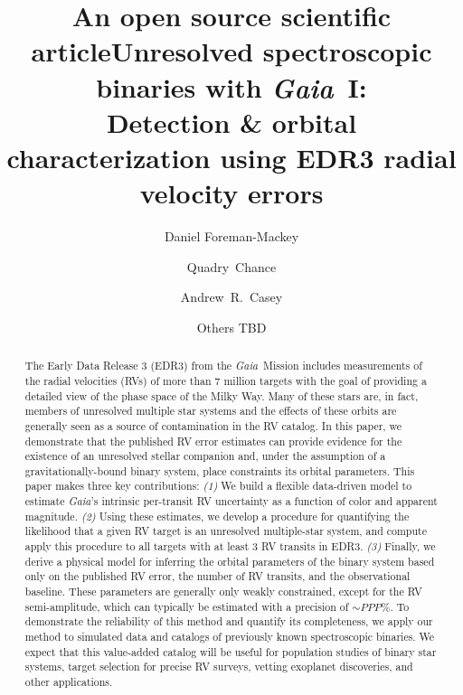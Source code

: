 \documentclass[modern, letterpaper]{aastex631}
\newcommand{\project}[1]{\textsl{#1}}
\newcommand{\Gaia}{\project{Gaia}}
\begin{document}
\title{An open source scientific article}

\title{Unresolved spectroscopic binaries with \Gaia\ I: \\
	Detection \& orbital characterization using EDR3 radial velocity errors}


\author[0000-0002-9328-5652]{Daniel Foreman-Mackey}

\author{Quadry~Chance}

\author{Andrew~R.~Casey}

\author{Others TBD}
\noaffiliation{}

\begin{abstract}
	The Early Data Release 3 (EDR3) from the \Gaia\ Mission includes measurements of the radial velocities (RVs) of more than 7 million targets with the goal of providing a detailed view of the phase space of the Milky Way.
	Many of these stars are, in fact, members of unresolved multiple star systems and the effects of these orbits are generally seen as a source of contamination in the RV catalog.
	In this paper, we demonstrate that the published RV error estimates can provide evidence for the existence of an unresolved stellar companion and, under the assumption of a gravitationally-bound binary system, place constraints its orbital parameters.
	This paper makes three key contributions:
	\emph{(1)} We build a flexible data-driven model to estimate \Gaia's intrinsic per-transit RV uncertainty as a function of color and apparent magnitude.
	\emph{(2)} Using these estimates, we develop a procedure for quantifying the likelihood that a given RV target is an unresolved multiple-star system, and compute apply this procedure to all targets with at least 3 RV transits in EDR3.
	\emph{(3)} Finally, we derive a physical model for inferring the orbital parameters of the binary system based only on the published RV error, the number of RV transits, and the observational baseline.
	These parameters are generally only weakly constrained, except for the RV semi-amplitude, which can typically be estimated with a precision of $\sim PPP\%$.
	To demonstrate the reliability of this method and quantify its completeness, we apply our method to simulated data and catalogs of previously known spectroscopic binaries.
	We expect that this value-added catalog will be useful for population studies of binary star systems, target selection for precise RV surveys, vetting exoplanet discoveries, and other applications.
\end{abstract}
\end{document}
